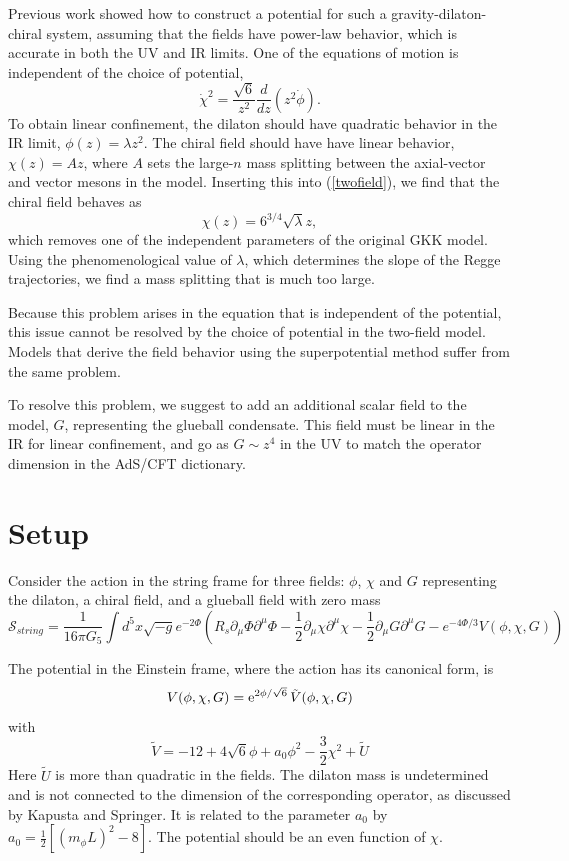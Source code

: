 \documentclass[12pt]{article}
\newcommand{\be}{\begin{equation}}
\newcommand{\ee}{\end{equation}}
\def\thalf{{\textstyle{\frac{1}{2}}}}
\def\tthalf{{\textstyle{\frac{3}{2}}}}
\def\root{\sqrt{-g}}
\def\Dz{\frac{d}{dz}}
\def\phidot{\dot{\phi}}
\def\chidot{\dot{\chi}}
\def\rt6{\sqrt{6}}
\def\mL2{(m_{\phi}L)^2}
\newcommand{\cS}{\mathcal S}
\begin{document}
Previous work showed how to construct a potential for such a gravity-dilaton-chiral system, assuming that the fields have power-law behavior, which is accurate in both the UV and IR limits. 
One of the equations of motion is independent of the choice of potential,
\be
\chidot^2  = \frac{\rt6}{z^2} \Dz(z^2\phidot). 
\label{twofield}
\ee
To obtain linear confinement, the dilaton should have quadratic behavior in the IR limit, $\phi(z)=\lambda z^2$.
The chiral field should have have linear behavior, $\chi(z)=A z$, where $A$ sets the large-$n$ mass splitting between the axial-vector and vector mesons in the model. 
Inserting this into (\ref{twofield}), we find that the chiral field behaves as
\be
\chi(z)=6^{3/4}\sqrt{\lambda}z,
\ee
which removes one of the independent parameters of the original GKK model. 
Using the phenomenological value of $\lambda$, which determines the slope of the Regge trajectories, we find a mass splitting that is much too large.

Because this problem arises in the equation that is independent of the potential, this issue cannot be resolved by the choice of potential in the two-field model. 
Models that derive the field behavior using the superpotential method suffer from the same problem.

To resolve this problem, we suggest to add an additional scalar field to the model, $G$, representing the glueball condensate. 
This field must be linear in the IR for linear confinement, and go as $G \sim z^4$ in the UV to match the operator dimension in the AdS/CFT dictionary.

\section{Setup}
Consider the action in the string frame for three fields: $\phi$, $\chi$ and $G$ representing the dilaton, a chiral field, and a glueball field with zero mass
\be
\cS_{string}=\frac{1}{16\pi G_5} \int d^5x \root e^{-2\Phi} \left(R_s\partial_\mu\Phi\partial^\mu\Phi - \thalf\partial_\mu\chi\partial^\mu\chi - \thalf\partial_\mu G \partial^\mu G -e^{-4\Phi/3}V(\phi,\chi,G)\right)
\ee

The potential in the Einstein frame, where the action has its canonical form, is
\be
V(\phi,\chi,G) = {\rm e}^{2\phi/\rt6} \, \tilde{V}(\phi,\chi,G) \label{transform}
\ee
with
\be
\tilde{V} = -12 + 4\sqrt{6}\phi + a_0\phi^2 -\tthalf\chi^2 + \tilde{U}
\label{V}
\ee
Here $\tilde{U}$ is more than quadratic in the fields.  
The dilaton mass is undetermined and is not connected to the dimension of the corresponding operator, as discussed by Kapusta and Springer.  
It is related to the parameter $a_0$ by $a_0 = \thalf \left[ \mL2-8 \right]$. 
The potential should be an even function of $\chi$. 
\end{document}
